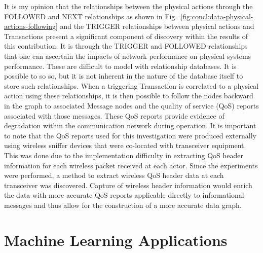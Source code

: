 It is my opinion that the relationships between the physical actions through the FOLLOWED and NEXT relationships as shown in Fig.~\ref{fig:concl:data-physical-actions-following} and the TRIGGER relationships between physical actions and Transactions present a significant component of discovery within the results of this contribution. It is through the TRIGGER and FOLLOWED relationships that one can ascertain the impacts of network performance on physical systems performance. These are difficult to model with relationship databases.  It is possible to so so, but it is not inherent in the nature of the database itself to store such relationships.  When a triggering Transaction is correlated to a physical action using these relationships, it is then possible to follow the nodes backward in the graph to associated Message nodes and the quality of service (QoS) reports associated with those messages. These QoS reports provide evidence of degradation within the communication network during operation.  It is important to note that the QoS reports used for this investigation were produced externally using wireless sniffer devices that were co-located with transceiver equipment.  This was done due to the implementation difficulty in extracting QoS header information for each wireless packet received at each actor.  Since the experiments were performed, a method to extract wireless QoS header data at each transceiver was discovered.  Capture of wireless header information would enrich the data with more accurate QoS reports applicable directly to informational messages and thus allow for the construction of a more accurate data graph.

\section{Machine Learning Applications}

